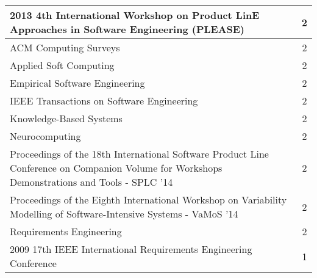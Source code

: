 \begin{longtable}{|p{11cm}|c|}
	2013 4th International Workshop on Product LinE Approaches in Software Engineering (PLEASE)                                                                                             & 2        \\ \hline
	ACM Computing Surveys                                                                                                                                                                   & 2        \\ \hline
	Applied Soft Computing                                                                                                                                                                  & 2        \\ \hline
	Empirical Software Engineering                                                                                                                                                          & 2        \\ \hline
	IEEE Transactions on Software Engineering                                                                                                                                               & 2        \\ \hline
	Knowledge-Based Systems                                                                                                                                                                 & 2        \\ \hline
	Neurocomputing                                                                                                                                                                          & 2        \\ \hline
	Proceedings of the 18th International Software Product Line Conference on Companion Volume for Workshops Demonstrations and Tools - SPLC '14                                            & 2        \\ \hline
	Proceedings of the Eighth International Workshop on Variability Modelling of Software-Intensive Systems - VaMoS '14                                                                     & 2        \\ \hline
	Requirements Engineering                                                                                                                                                                & 2        \\ \hline
	2009 17th IEEE International Requirements Engineering Conference                                                                                                                        & 1        \\ \hline

\end{longtable}
